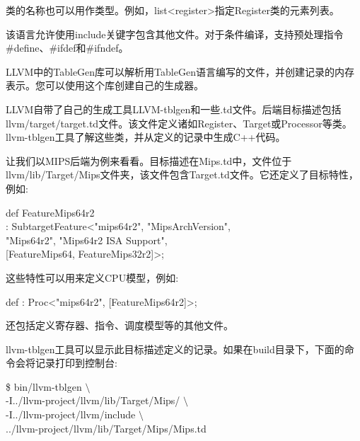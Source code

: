 类的名称也可以用作类型。例如，list<register>指定Register类的元素列表。\par

该语言允许使用include关键字包含其他文件。对于条件编译，支持预处理指令\#define、\#ifdef和\#ifndef。\par

LLVM中的TableGen库可以解析用TableGen语言编写的文件，并创建记录的内存表示。您可以使用这个库创建自己的生成器。\par

LLVM自带了自己的生成工具LLVM-tblgen和一些.td文件。后端目标描述包括llvm/target/\allowbreak target.td文件。该文件定义诸如Register、Target或Processor等类。llvm-tblgen工具了解这些类，并从定义的记录中生成C++代码。\par

让我们以MIPS后端为例来看看。目标描述在Mips.td中，文件位于llvm/lib/Target/Mips文件夹，该文件包含Target.td文件。它还定义了目标特性，例如:\par

\begin{tcolorbox}[colback=white,colframe=black]
def FeatureMips64r2 \\
\hspace*{0.5cm}: SubtargetFeature<"mips64r2", "MipsArchVersion",  \\
\hspace*{4cm}"Mips64r2", "Mips64r2 ISA Support", \\
\hspace*{4cm}[FeatureMips64, FeatureMips32r2]>;
\end{tcolorbox}

这些特性可以用来定义CPU模型，例如:\par

\begin{tcolorbox}[colback=white,colframe=black]
def : Proc<"mips64r2", [FeatureMips64r2]>;
\end{tcolorbox}

还包括定义寄存器、指令、调度模型等的其他文件。\par

llvm-tblgen工具可以显示此目标描述定义的记录。如果在build目录下，下面的命令会将记录打印到控制台:\par

\begin{tcolorbox}[colback=white,colframe=black]
\$ bin/llvm-tblgen $\setminus$ \\
\hspace*{0.5cm}-I../llvm-project/llvm/lib/Target/Mips/ $\setminus$ \\
\hspace*{0.5cm}-I../llvm-project/llvm/include $\setminus$ \\
\hspace*{0.5cm}../llvm-project/llvm/lib/Target/Mips/Mips.td
\end{tcolorbox}

